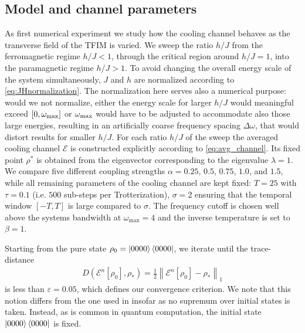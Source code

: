 \documentclass[12pt,a4paper]{article}
\let\varepsilon\varepsilon
\newcommand{\SA}[1]{{\color{orange}{[SA: #1]}}}
\begin{document}
\subsection{Model and channel parameters}


As first numerical experiment we study how the cooling channel behaves as the transverse field of the TFIM is varied. We sweep the ratio $h/J$ from the ferromagnetic regime $h/J<1$, through the critical region around $h/J=1$, into the paramagnetic regime $h/J>1$. To avoid changing the overall energy scale of the system simultaneously, $J$ and $h$ are normalized according to \cref{eq:JHnormalization}. The normalization here serves also a numerical purpose: would we not normalize, either the energy scale for larger $h/J$ would meaningful exceed $[0, \omega_{\rm max}]$ or $\omega_{\rm max}$ would have to be adjusted to accommodate also those large energies, resulting in an artificially coarse frequency spacing $\Delta \omega$, that would distort results for smaller $h/J$.
%
For each ratio $h/J$ %
of the sweep the averaged cooling channel $\mathcal{E}$ is constructed explicitly according to \cref{eq:avg_channel}. Its fixed point $\rho^*$ is obtained from the eigenvector corresponding to the eigenvalue $\lambda=1$. We compare five different coupling strengths $\alpha=0.25$, $0.5$, $0.75$, $1.0$, and $1.5$, while all remaining parameters of the cooling channel are kept fixed:
$T=25$ with $\tau = 0.1$ (i.e. $500$ sub-steps per Trotterization), $\sigma = 2$ ensuring that the temporal window $[-T,T]$ is large compared to $\sigma$. The frequency cutoff is chosen well above the systems bandwidth at $\omega_{\max}=4$ and the inverse temperature is set to $\beta=1$.

Starting from the pure state $\rho_0=\ket{0000}\bra{0000}$, we iterate until 
the trace-distance
\begin{align}\label{eq:tracedistance}
    D(\mathcal{E}^n[\rho_0],\rho_*) = \tfrac 12 \left\| \mathcal{E}^n[\rho_0] - \rho_*\right\|_1
\end{align} is less than $\varepsilon = 0.05$, which defines our convergence criterion. We note that this notion %
differs from the one used in \citet{ding2025} insofar as no supremum over initial states is taken. Instead, as is common in quantum computation, the initial state $\ket{0000}\bra{0000}$ is fixed. 
\end{document}
